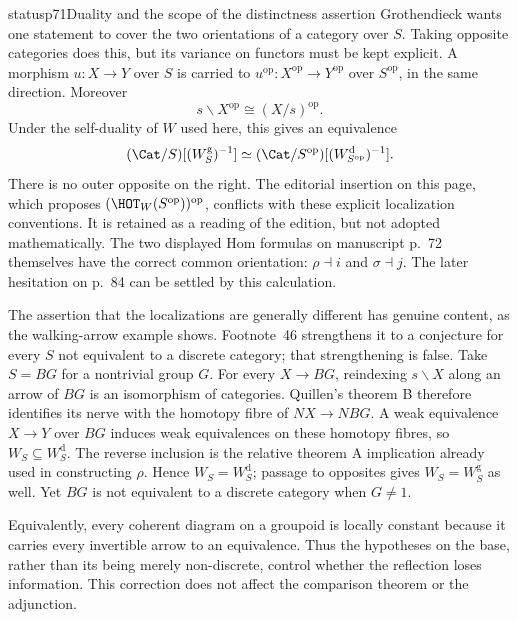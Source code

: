 \begin{dcomment}{status}{p71}{Duality and the scope of the distinctness assertion}
Grothendieck wants one statement to cover the two orientations of a category over $S$. Taking opposite categories does this, but its variance on functors must be kept explicit. A morphism $u:X\to Y$ over $S$ is carried to $u^{\mathrm{op}}:X^{\mathrm{op}}\to Y^{\mathrm{op}}$ over $S^{\mathrm{op}}$, in the same direction. Moreover
\[
 s\backslash X^{\mathrm{op}}\cong(X/s)^{\mathrm{op}}.
\]
Under the self-duality of $W$ used here, this gives an equivalence
\[
 (\Cat/S)[(W_S^{\mathrm g})^{-1}]
 \simeq(\Cat/S^{\mathrm{op}})[(W_{S^{\mathrm{op}}}^{\mathrm d})^{-1}].
\]
There is no outer opposite on the right. The editorial insertion on this page, which proposes $(\HOT_W(S^{\mathrm{op}}))^{\mathrm{op}}$, conflicts with these explicit localization conventions. It is retained as a reading of the edition, but not adopted mathematically. The two displayed Hom formulas on manuscript p.~72 themselves have the correct common orientation: $\rho\dashv i$ and $\sigma\dashv j$. The later hesitation on p.~84 can be settled by this calculation.

The assertion that the localizations are generally different has genuine content, as the walking-arrow example shows. Footnote~46 strengthens it to a conjecture for every $S$ not equivalent to a discrete category; that strengthening is false. Take $S=BG$ for a nontrivial group $G$. For every $X\to BG$, reindexing $s\backslash X$ along an arrow of $BG$ is an isomorphism of categories. Quillen's theorem B \citep[\S1, Theorem~B]{Quillen1973} therefore identifies its nerve with the homotopy fibre of $NX\to NBG$. A weak equivalence $X\to Y$ over $BG$ induces weak equivalences on these homotopy fibres, so $W_S\subseteq W_S^{\mathrm d}$. The reverse inclusion is the relative theorem A implication already used in constructing $\rho$. Hence $W_S=W_S^{\mathrm d}$; passage to opposites gives $W_S=W_S^{\mathrm g}$ as well. Yet $BG$ is not equivalent to a discrete category when $G\ne1$.

Equivalently, every coherent diagram on a groupoid is locally constant because it carries every invertible arrow to an equivalence. Thus the hypotheses on the base, rather than its being merely non-discrete, control whether the reflection loses information. This correction does not affect the comparison theorem or the adjunction.
\end{dcomment}

